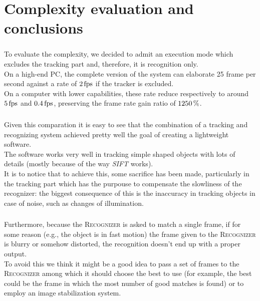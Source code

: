 \documentclass{beamer}
\begin{document}
  \section{Complexity evaluation and conclusions}

  \begin{frame}
    \frametitle{\insertsection}
	To evaluate the complexity, we decided to admit an execution mode which
	excludes the tracking part and, therefore, it is recognition only.\\
	On a high-end PC, the complete version of the system can elaborate 25 frame
    per second against a rate of $\unit[2]{fps}$ if the tracker is excluded.\\
    On a computer with lower capabilities, these rate reduce respectively to
    around $\unit[5]{fps}$ and $\unit[0.4]{fps}$, preserving the frame rate
    gain ratio of $\unit[1250]{\%}$.\\
  \end{frame}

  \begin{frame}
    \frametitle{\insertsection}
    Given this comparation it is easy to see that the combination of a tracking
	and recognizing system achieved pretty well the goal of creating a
    lightweight software.\\
    The software works very well in tracking simple shaped objects with lots of
    details (mostly because of the way \emph{SIFT} works).\\
    It is to notice that to achieve this, some sacrifice has been made,
    particularly in the tracking part which has the purpouse to compensate
    the slowliness of the recognizer: the biggest consequence of this is
    the inaccuracy in tracking objects in case of noise, such as changes of
    illumination.\\
  \end{frame}

  \begin{frame}
    \frametitle{\insertsection}
 	Furthermore, because the \textsc{Recognizer} is asked to match a single
    frame, if for some reason (e.g., the object is in fast motion) the frame
    given to the \textsc{Recognizer} is blurry or somehow distorted, the
    recognition doesn't end up with a proper output.\\
	To avoid this we think it might be a good idea to pass a set of frames to
	the \textsc{Recognizer} among which it should choose the best to use (for
    example, the best could be the frame in which the most number of good
    matches is found) or to employ an image stabilization system.\\
  \end{frame}
\end{document}
